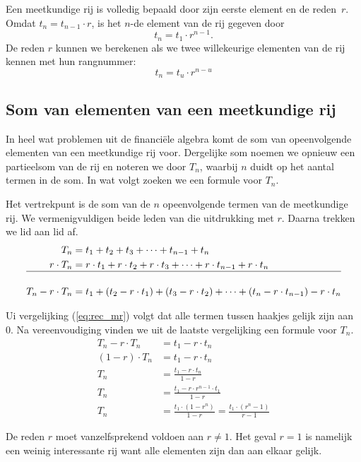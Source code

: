Een meetkundige rij is volledig bepaald door zijn eerste element en de reden~$r$. Omdat $t_n=t_{n-1}\cdot r$, is het $n$-de element van de rij gegeven door
\begin{equation}
\label{eq:rec_mr}
t_n=t_1\cdot r^{n-1}.
\end{equation}
De reden $r$ kunnen we berekenen als we twee willekeurige elementen van de rij kennen met hun rangnummer:
\[
t_n=t_u\cdot r^{n-u}
\]

\subsection{Som van elementen van een meetkundige rij}\label{subsec.Tn}
In heel wat problemen uit de financi\"{e}le algebra komt de som van
opeenvolgende elementen van een meetkundige rij voor. Dergelijke som noemen we
opnieuw een partieelsom van de rij en noteren we door $T_{n}$,
waarbij $n$ duidt op het aantal termen in de som. In wat volgt zoeken we een formule voor $T_{n}$.


Het vertrekpunt is de som van de $n$ opeenvolgende termen van de meetkundige rij. We
vermenigvuldigen beide leden van die uitdrukking met $r$. Daarna
trekken we lid aan lid af.
\begin{align*}
    T_{n} &=  t_{1}+t_{2}+t_{3}+\dots +t_{n-1}+t_{n}  \\
    r\cdot T_{n} &= r\cdot t_{1}+r\cdot t_{2}+r\cdot t_{3}+\dots +r\cdot
    t_{n-1}+r\cdot t_{n}  \\ \hline \\
    T_{n}-r\cdot T_{n} &= t_{1}+(t_{2}-r\cdot t_{1})+ (t_{3}-r\cdot
    t_{2})+ \dots +(t_{n}-r\cdot t_{n-1})-r\cdot t_{n}
\end{align*}

Ui vergelijking (\ref{eq:rec_mr}) volgt dat alle termen tussen haakjes gelijk zijn aan 0. Na vereenvoudiging vinden we uit de
laatste vergelijking een formule voor $T_{n}$.
\begin{align*}
    T_{n}-r\cdot T_{n} &= t_{1}-r\cdot t_{n}  \\
    (1-r)\cdot T_{n} &=  t_{1}-r\cdot t_{n} \\
    T_{n} &= \frac{t_{1}-r\cdot t_{n}}{1-r}  \\
    T_{n} &= \frac{t_{1}-r\cdot r^{n-1} \cdot t_{1}}{1-r}\\
    T_{n} &= \frac{t_{1}\cdot (1-r^{n})}{1-r}=\frac{t_{1}\cdot
    (r^{n}-1)}{r-1}
\end{align*}


De reden $r$ moet vanzelfsprekend voldoen aan $r\neq 1$. Het geval $r=1$ is namelijk een weinig interessante rij
want alle elementen zijn dan aan elkaar gelijk. 


